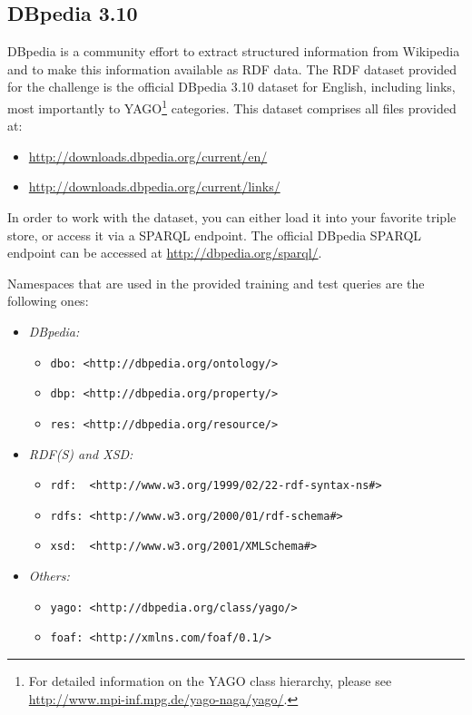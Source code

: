 

\subsection{DBpedia 3.10}
\label{sec:dbpedia}

DBpedia is a community effort to extract structured information from Wikipedia and to make this information available as RDF data. 
The RDF dataset provided for the challenge is the official DBpedia 3.10 dataset for English, including links, most importantly to YAGO\footnote{For detailed information on the YAGO class hierarchy, please see \url{http://www.mpi-inf.mpg.de/yago-naga/yago/}.} categories. This dataset comprises all files provided at: 
\begin{itemize}
\item \url{http://downloads.dbpedia.org/current/en/}
\item \url{http://downloads.dbpedia.org/current/links/}
\end{itemize}
In order to work with the dataset, you can either load it into your favorite triple store, or access it via a SPARQL endpoint. 
The official DBpedia SPARQL endpoint can be accessed at \url{http://dbpedia.org/sparql/}. 

Namespaces that are used in the provided training and test queries are the following ones:
\begin{itemize}
\item \emph{DBpedia:}
  \begin{itemize}
  \item[] \texttt{dbo: <http://dbpedia.org/ontology/>} 
  \item[] \texttt{dbp: <http://dbpedia.org/property/>} 
  \item[] \texttt{res: <http://dbpedia.org/resource/>} 
  \end{itemize}
\item \emph{RDF(S) and XSD:}
  \begin{itemize}
  \item[] \texttt{rdf:\ \ <http://www.w3.org/1999/02/22-rdf-syntax-ns\#>} 
  \item[] \texttt{rdfs: <http://www.w3.org/2000/01/rdf-schema\#>} 
  \item[] \texttt{xsd:\ \ <http://www.w3.org/2001/XMLSchema\#>}
  \end{itemize}
\item \emph{Others:}
  \begin{itemize}
  \item[] \texttt{yago: <http://dbpedia.org/class/yago/>} 
  \item[] \texttt{foaf: <http://xmlns.com/foaf/0.1/> } 
  \end{itemize}
\end{itemize}


